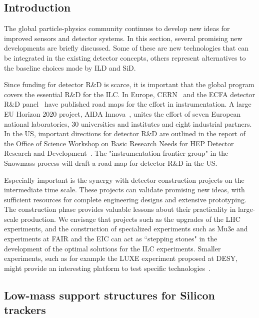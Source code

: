 \subsection{Introduction}
\label{sec:det-intro}


The global particle-physics community continues to develop new ideas for improved sensors and detector systems. In this section, several promising new developments are briefly discussed. Some of these are new technologies that can be integrated in the existing detector concepts, others represent alternatives to the baseline choices made by ILD and SiD. 


Since funding for detector R\&D is scarce, it is important that the global program covers the essential R\&D for the ILC. In Europe, CERN~\cite{Aglieri:2764386} and the ECFA detector R\&D panel~\cite{Detector:2784893} have published road maps for the effort in instrumentation. A large EU Horizon 2020 project, AIDA Innova~\cite{AIDAINNOVA}, unites the effort of seven European national laboratories, 30 universities and institutes and eight industrial partners. In the US, important directions for detector R\&D are outlined in the report of the Office of Science Workshop on Basic Research Needs for HEP Detector Research and Development~\cite{osti_1659761}. The "instrumentation frontier group" in the Snowmass process will draft a road map for detector R\&D in the US. 

Especially important is the synergy with detector construction projects on the intermediate time scale. These projects can validate promising new ideas, with sufficient resources for complete engineering designs and extensive prototyping. The construction phase provides valuable lessons about their practicality in large-scale production. We envisage that projects such as the upgrades of the LHC experiments, and the construction of specialized experiments such as Mu3e and experiments at FAIR and the EIC can act as ``stepping stones" in the development of the optimal solutions for the ILC experiments. Smaller experiments, such as for example the LUXE experiment proposed at DESY, might provide an interesting platform to test specific technologies~\cite{Abramowicz:2021zja}.

\subsection{Low-mass support structures for Silicon trackers}
\label{sec:det-thinsilicon}
 


